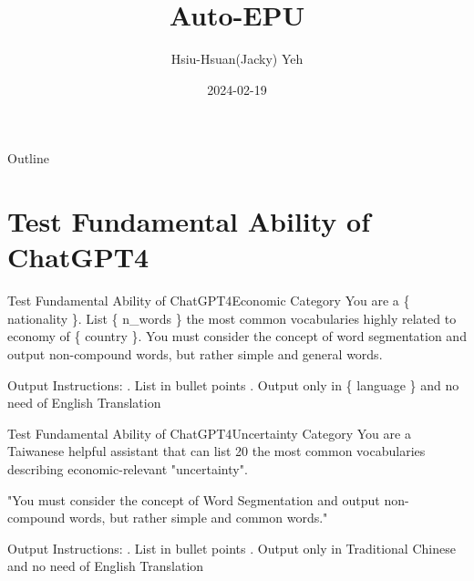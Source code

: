\documentclass[11.5pt]{beamer}
\title{\huge{Auto-EPU}}
\author{Hsiu-Hsuan(Jacky) Yeh}
\date{2024-02-19}
\begin{document}
\maketitle


\begin{frame}{Outline}
\tableofcontents
\end{frame}


\section{Test Fundamental Ability of ChatGPT4}


\begin{frame}{Test Fundamental Ability of ChatGPT4}{Economic Category}
You are a \{ nationality \}. List \{ n\_words \} the most common vocabularies highly related to economy of
\{ country \}. You must consider the concept of word segmentation and output
non-compound words, but rather simple and general words. \newline

Output Instructions: . List in bullet points . Output only in \{ language \} and no need of English Translation
\end{frame}


\begin{frame}{Test Fundamental Ability of ChatGPT4}{Uncertainty Category}
You are a Taiwanese helpful assistant that can list 20 the most common
vocabularies describing economic-relevant "uncertainty". \newline

"You must consider the concept of Word Segmentation and output non-compound
words, but rather simple and common words." \newline

Output Instructions: . List in bullet points . Output only in Traditional Chinese and no need of English Translation
\end{frame}
\end{document}
